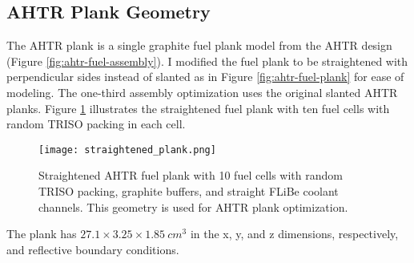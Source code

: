 \subsection{AHTR Plank Geometry}
\label{sec:ahtr-plank-geometry}
The \gls{AHTR} plank is a single graphite fuel plank model from the \gls{AHTR} design 
(Figure \ref{fig:ahtr-fuel-assembly}). 
I modified the fuel plank to be straightened with perpendicular sides instead 
of slanted as in Figure \ref{fig:ahtr-fuel-plank} for ease of modeling. 
The one-third assembly optimization uses the original slanted \gls{AHTR} planks. 
Figure \ref{fig:straightened_plank} illustrates the straightened fuel plank with 
ten fuel cells with random \gls{TRISO} packing in each cell.
\begin{figure}[htbp]
    \centering
    \texttt{[image: straightened\_plank.png]}
    \raggedright
    \caption{Straightened \acrfull{AHTR} fuel plank with 10 fuel cells with random 
    TRISO packing, graphite buffers, and straight \gls{FLiBe} coolant channels. 
    This geometry is used for \gls{AHTR} plank optimization.}
    \label{fig:straightened_plank}
\end{figure}
The plank has $27.1 \times 3.25 \times 1.85\ cm^3$ in the x, y, and z dimensions,
respectively, and reflective boundary conditions.

